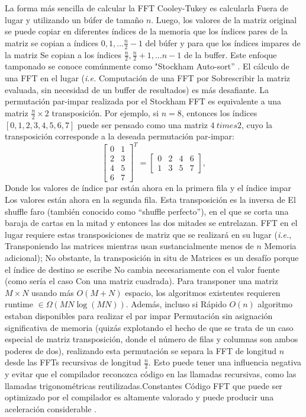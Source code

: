 ﻿\documentclass[10pt]{article}
\begin{document}
La forma más sencilla de calcular la FFT Cooley-Tukey es calcularla
Fuera de lugar y utilizando un búfer de tamaño $ n $. Luego, los valores de la matriz original se puede copiar en diferentes índices de la memoria que los índices pares de la matriz se copian a índices $0, 1, \ldots \frac {n} {2}-1$ del búfer y para que los índices impares de la matriz
Se copian a los índices $\frac{n}{2}, \frac{n}{2}+1, \ldots n-1$ de la
buffer. Este enfoque tamponado se conoce comúnmente como "Stockham
Auto-sort” \cite {cochran: fast}.
El cálculo de una FFT en el lugar (\emph{i.e.} Computación de una FFT por
Sobrescribir la matriz evaluada, sin necesidad de un buffer de resultados) es
más desafiante. La permutación par-impar realizada por el Stockham
FFT es equivalente a una matriz $\frac{n}{2} \times 2$
transposición. Por ejemplo, si $n = 8$, entonces los índices $[0, 1, 2, 3, 4, 5, 6, 7]$ puede ser pensado como una matriz $4 \ times 2$, cuyo la transposición corresponde a la deseada permutación par-impar:
\[ 
\left[
  \begin{matrix}
    0 & 1\\
    2 & 3\\
    4 & 5\\
    6 & 7
  \end{matrix}
\right]^T = 
\left[
  \begin{matrix}
    0 & 2 & 4 & 6\\
    1 & 3 & 5 & 7
  \end{matrix}
\right],
\]
Donde los valores de índice par están ahora en la primera fila y el índice impar
Los valores están ahora en la segunda fila. Esta transposición es la inversa de
El shuffle faro (también conocido como “shuffle perfecto”)\cite{sedgewick: algorithms}, en el que se corta una baraja de cartas en la mitad y entonces las dos mitades se entrelazan. FFT en el lugar requiere estas transposiciones de matriz que se realizará en su lugar (\emph{i.e.},
Transponiendo las matrices mientras usan sustancialmente menos de $n$
Memoria adicional); No obstante, la transposición in situ de
Matrices es un desafío porque el índice de destino se escribe
No cambia necesariamente con el valor fuente (como sería el caso
Con una matriz cuadrada). Para transponer una matriz $M \times N$ usando más $O(M + N)$ espacio, los algoritmos existentes requieren runtime $\in
\Omega (M N \log(M N))$\cite{fich: permuting}. Además, incluso si
Rápido $O(n)$ algoritmo estaban disponibles para realizar el par impar
Permutación sin asignación significativa de memoria (quizás explotando el hecho de que se trata de un caso especial de matriz transposición, donde el número de filas y columnas son ambos poderes de dos), realizando esta permutación se separa la FFT de longitud $n$ desde las FFTs recursivas de longitud $\frac{n}{2}$. Esto puede tener una influencia negativa y evitar que el compilador reconozca código en las llamadas recursivas, como las llamadas trigonométricas reutilizadas.Constantes Código FFT que puede ser optimizado por el compilador es altamente valorado y puede producir una aceleración considerable \cite{myrnyy: simple}.
\end{document}
